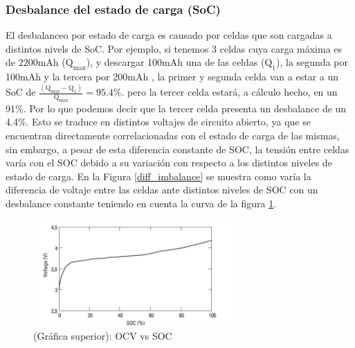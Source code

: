 \documentclass[10pt,a4paper]{article}
\begin{document}
	\subsubsection{Desbalance del estado de carga (SoC)}
	
	\noindent El desbalanceo por estado de carga es causado por celdas que son cargadas a distintos nivels de SoC. Por ejemplo, si tenemos 3 celdas cuya carga máxima es de 2200mAh ($\mathrm{Q_{max}}$), y descargar 100mAh una de las celdas ($\mathrm{Q_1}$), la segunda por 100mAh y la tercera por 200mAh , la primer y segunda celda van a estar a un SoC de $\mathrm{\frac{(Q_{max} - Q_1)}{Q_{max}} = 95.4\%}$. pero la tercer celda estará, a cálculo hecho, en un 91\%. Por lo que podemos decir que la tercer celda presenta un desbalance de un 4.4\%. Esto se traduce en distintos voltajes de circuito abierto, ya que se encuentran directamente correlacionadas con el estado de carga de las mismas, sin embargo, a pesar de esta diferencia constante de SOC, la tensión entre celdas varía con el SOC debido a su variación con respecto a los distintos niveles de estado de carga. En la Figura \ref{diff_imbalance} se muestra como varía la diferencia de voltaje entre las celdas ante distintos niveles de SOC con un desbalance constante teniendo en cuenta la curva de la figura \ref{OCV_SOC_equalization_figure}.\\
	
	
	\begin{figure}[h!]
		\begin{center}
			\includegraphics[width=0.7\textwidth]{SOC_vs_OCV_equalization.png}
			\caption{(Gráfica superior): OCV vs SOC}
			\label{OCV_SOC_equalization_figure}
		\end{center}
	\end{figure}
	
	\clearpage 
	
\end{document}
